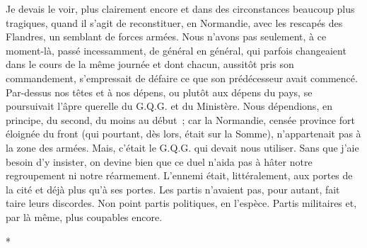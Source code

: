 \documentclass[french,twoside]{book} %
\begin{document}
Je devais le voir, plus clairement encore et dans des circonstances beaucoup plus tragiques, quand il s’agit de reconstituer, en Normandie, avec les rescapés des Flandres, un semblant de forces armées. Nous n’avons pas seulement, à ce moment-là, passé incessamment, de général en général, qui parfois changeaient dans le cours de la même journée et dont chacun, aussitôt pris son commandement, s’empressait de défaire ce que son prédécesseur avait commencé. Par-dessus nos têtes et à nos dépens, ou plutôt aux dépens du pays, se poursuivait l’âpre querelle du G.Q.G. et du Ministère. Nous dépendions, en principe, du second, du moins au début ; car la   Normandie, censée province fort éloignée du front (qui pourtant, dès lors, était sur la Somme), n’appartenait pas à la zone des armées. Mais, c’était le G.Q.G. qui devait nous utiliser. Sans que j’aie besoin d’y insister, on devine bien que ce duel n’aida pas à hâter notre regroupement ni notre réarmement. L’ennemi était, littéralement, aux portes de la cité et déjà plus qu’à ses portes. Les partis n’avaient pas, pour autant, fait taire leurs discordes. Non point partis politiques, en l’espèce. Partis militaires et, par là même, plus coupables encore.\par

\begin{center}
\noindent \centerline{*}\par
\end{center}
\end{document}
